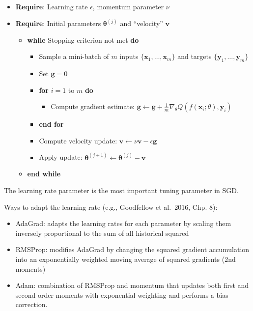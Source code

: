 \documentclass[
]{book}
\providecommand{\tightlist}{%
  \setlength{\itemsep}{0pt}\setlength{\parskip}{0pt}}
\begin{document}
\begin{itemize}
\item
  \textbf{Require}: Learning rate \(\epsilon\), momentum parameter \(\nu\)
\item
  \textbf{Require}: Initial parameters \(\mathbf{\theta}^{(j)}\) and ``velocity'' \(\mathbf{v}\)

  \begin{itemize}
  \item
    \textbf{while} Stopping criterion not met \textbf{do}

    \begin{itemize}
    \item
      Sample a mini-batch of \(m\) inputs \(\{ \mathbf{x}_1, \dots, \mathbf{x}_m \}\) and targets \(\{ \mathbf{y}_1, \dots, \mathbf{y}_m \}\)
    \item
      Set \(\mathbf{g} = 0\)
    \item
      \textbf{for} \(i = 1\) to \(m\) \textbf{do}

      \begin{itemize}
      \tightlist
      \item
        Compute gradient estimate: \(\mathbf{g} \leftarrow \mathbf{g} + \frac{1}{m} \nabla_\theta Q(f(\mathbf{x}_i; \theta), \mathbf{y}_i)\)
      \end{itemize}
    \item
      \textbf{end for}
    \item
      Compute velocity update: \(\mathbf{v} \leftarrow \nu \mathbf{v} - \epsilon \mathbf{g}\)
    \item
      Apply update: \(\mathbf{\theta}^{(j +1)} \leftarrow \mathbf{\theta}^{(j)} - \mathbf{v}\)
    \end{itemize}
  \item
    \textbf{end while}
  \end{itemize}
\end{itemize}

The learning rate parameter is the most important tuning parameter in SGD.

Ways to adapt the learning rate (e.g., Goodfellow et al.~2016, Chp. 8):

\begin{itemize}
\item
  AdaGrad: adapts the learning rates for each parameter by scaling them inversely proportional to the sum of all historical squared
\item
  RMSProp: modifies AdaGrad by changing the squared gradient accumulation into an exponentially weighted moving average of squared gradients (2nd moments)
\item
  Adam: combination of RMSProp and momentum that updates both first and second-order moments with exponential weighting and performs a bias correction.
\end{itemize}
\end{document}
